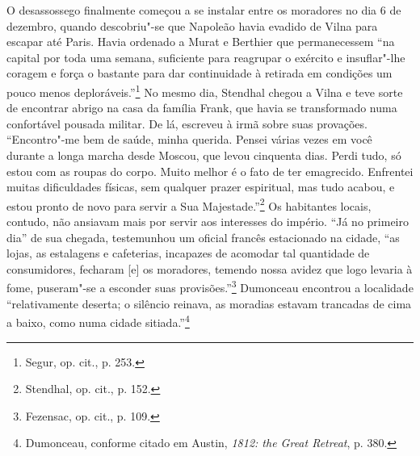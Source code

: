 O desassossego finalmente começou a se instalar entre os moradores no
dia 6 de dezembro, quando descobriu"-se que Napoleão havia evadido de
Vilna para escapar até Paris. Havia ordenado a Murat e Berthier que
permanecessem ``na capital por toda uma semana, suficiente para
reagrupar o exército e insuflar"-lhe coragem e força o bastante para dar
continuidade à retirada em condições um pouco menos
deploráveis.''\footnote{Segur, op. cit., p. 253.} No mesmo dia, Stendhal
chegou a Vilna e teve sorte de encontrar abrigo na casa da família
Frank, que havia se transformado numa confortável pousada militar. De
lá, escreveu à irmã sobre suas provações. ``Encontro"-me bem de saúde,
minha querida. Pensei várias vezes em você durante a longa marcha desde
Moscou, que levou cinquenta dias. Perdi tudo, só estou com as roupas do
corpo. Muito melhor é o fato de ter emagrecido. Enfrentei muitas
dificuldades físicas, sem qualquer prazer espiritual, mas tudo acabou, e
estou pronto de novo para servir a Sua Majestade.''\footnote{Stendhal, op. cit., p. 152.} Os habitantes locais, contudo, não ansiavam mais por servir aos interesses do império. ``Já no primeiro dia'' de sua
chegada, testemunhou um oficial francês estacionado na cidade, ``as
lojas, as estalagens e cafeterias, incapazes de acomodar tal quantidade
de consumidores, fecharam {[}e{]} os moradores, temendo nossa avidez que
logo levaria à fome, puseram"-se a esconder suas provisões.''\footnote{Fezensac, op. cit., p. 109.} Dumonceau encontrou a localidade ``relativamente deserta; o silêncio reinava, as moradias estavam trancadas de cima a
baixo, como numa cidade sitiada.''\footnote{Dumonceau, conforme citado em Austin, \textit{1812: the Great Retreat}, p. 380.}

